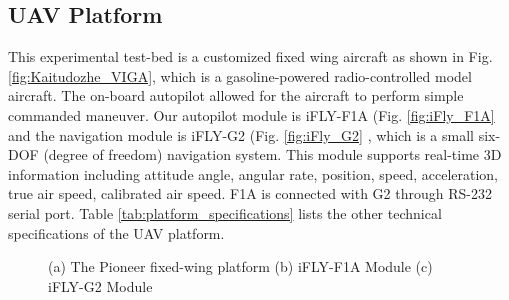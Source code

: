 \subsection{UAV Platform}
This experimental test-bed is  a customized fixed wing aircraft as shown in Fig. \ref{fig:Kaitudozhe_VIGA}, which is a gasoline-powered radio-controlled model aircraft. The on-board autopilot allowed for the aircraft to perform simple commanded maneuver. Our autopilot module is iFLY-F1A (Fig. \ref{fig:iFly_F1A} and the navigation module is iFLY-G2 (Fig. \ref{fig:iFly_G2} \cite{IFLY}, which is a small six-DOF (degree of freedom) navigation system. This module supports real-time 3D information including attitude angle, angular rate, position, speed, acceleration, true air speed, calibrated air speed. F1A is connected with G2 through RS-232 serial port. Table \ref{tab:platform_specifications} lists the other technical specifications of the UAV platform.

\begin{figure}[!tb]
	\centering
	\caption{(a) The Pioneer fixed-wing platform (b) iFLY-F1A Module   (c) iFLY-G2 Module}
\end{figure}



